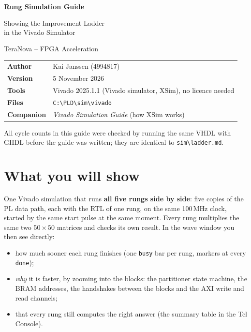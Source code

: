 \documentclass[11pt,a4paper]{article}
\newcommand{\code}[1]{\texttt{#1}}
\newcommand{\bs}{\textbackslash\allowbreak{}}
\renewcommand{\_}{\oldunderscore\allowbreak{}}
\begin{document}
\begin{titlepage}
\centering
\vspace*{3cm}
{\LARGE\bfseries Rung Simulation Guide\par}
\vspace{0.5cm}
{\Large Showing the Improvement Ladder\\in the Vivado Simulator\par}
\vspace{0.3cm}
{\large TeraNova -- FPGA Acceleration\par}
\vspace{2cm}
\begin{tabular}{@{}ll@{}}
\textbf{Author}   & Kai Janssen (4994817) \\
\textbf{Version}  & 5 November 2026 \\
\textbf{Tools}    & Vivado 2025.1.1 (Vivado simulator, XSim), no licence needed \\
\textbf{Files}    & \code{C:\bs PLD\bs sim\bs vivado} \\
\textbf{Companion}& \emph{Vivado Simulation Guide} (how XSim works) \\
\end{tabular}
\vfill
{\small All cycle counts in this guide were checked by running the same VHDL with GHDL before the guide was written; they are identical to \code{sim\bs ladder.md}.\par}
\end{titlepage}

\tableofcontents
\newpage

\section{What you will show}
One Vivado simulation that runs \textbf{all five rungs side by side}: five copies of the PL data path, each with the RTL of one rung, on the same 100\,MHz clock, started by the same start pulse at the same moment. Every rung multiplies the same two $50\times50$ matrices and checks its own result. In the wave window you then see directly:

\begin{itemize}[nosep]
  \item how much sooner each rung finishes (one \code{busy} bar per rung, markers at every \code{done});
  \item \emph{why} it is faster, by zooming into the blocks: the partitioner state machine, the BRAM addresses, the handshakes between the blocks and the AXI write and read channels;
  \item that every rung still computes the right answer (the summary table in the Tcl Console).
\end{itemize}
\end{document}
